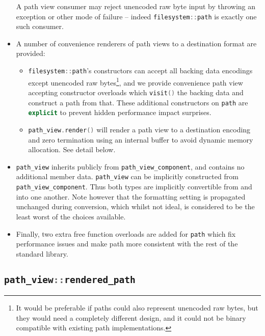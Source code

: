 \documentclass[11pt]{article}
\newcommand{\code}[2][cpp]{\lstinline[language=#1,basicstyle=\small\ttfamily]{#2}}
\begin{document}
\begin{itemize}
    A path view consumer may reject unencoded raw byte input by throwing an exception or other mode of failure -- indeed \code{filesystem::path} is exactly one such consumer.
    \item A number of convenience renderers of path views to a destination format are provided:
    \begin{itemize}
        \item \code{filesystem::path}'s constructors can accept all backing data encodings except unencoded raw bytes\footnote{It would be preferable if paths could also represent unencoded raw bytes, but they would need a completely different design, and it could not be binary compatible with existing path implementations.}, and we provide convenience path view accepting constructor overloads which \code{visit()} the backing data and construct a path from that. These additional constructors on \code{path} are \code{explicit} to prevent hidden performance impact surprises.
        \item \code{path_view.render()} will render a path view to a destination encoding and zero termination using an internal buffer to avoid dynamic memory allocation. See detail below.
    \end{itemize}
    \item \code{path_view} inherits publicly from \code{path_view_component}, and contains no additional member data. \code{path_view} can be implicitly constructed from \code{path_view_component}. Thus both types are implicitly convertible from and into one another. Note however that the formatting setting is propagated unchanged during conversion, which whilst not ideal, is considered to be the least worst of the choices available.
    \item Finally, two extra free function overloads are added for \code{path} which fix performance issues and make path more consistent with the rest of the standard library.
\end{itemize}

\subsection{\code{path_view::rendered_path}}
\end{document}
